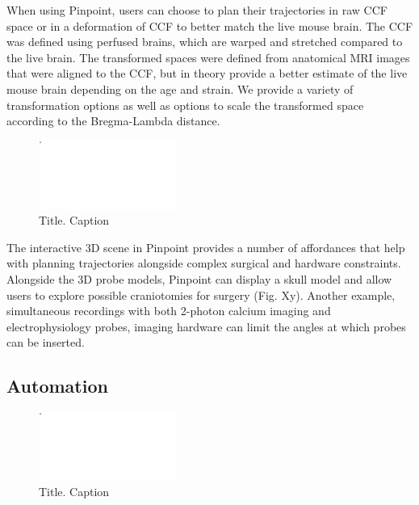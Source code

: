 When using Pinpoint, users can choose to plan their trajectories in raw CCF space or in a deformation of CCF to better match the live mouse brain. The CCF was defined using perfused brains, which are warped and stretched compared to the live brain. The transformed spaces were defined from anatomical MRI images that were aligned to the CCF, but in theory provide a better estimate of the live mouse brain depending on the age and strain. We provide a variety of transformation options as well as options to scale the transformed space according to the Bregma-Lambda distance.

\begin{figure}
\centering
\includegraphics[keepaspectratio,width=0.4\textwidth]{figures/figure-3.pdf}
\caption[mini-caption]{Title. Caption}
\label{fig:rig_hardware}
\end{figure}

The interactive 3D scene in Pinpoint provides a number of affordances that help with planning trajectories alongside complex surgical and hardware constraints. Alongside the 3D probe models, Pinpoint can display a skull model and allow users to explore possible craniotomies for surgery (Fig. Xy). Another example, simultaneous recordings with both 2-photon calcium imaging and electrophysiology probes, imaging hardware can limit the angles at which probes can be inserted.


\subsection{Automation}

\begin{figure}
\centering
\includegraphics[keepaspectratio,width=0.4\textwidth]{figures/figure-4.pdf}
\caption[mini-caption]{Title. Caption}
\label{fig:automation}
\end{figure}

